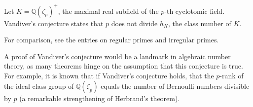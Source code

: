 \documentclass[12pt]{article}
\newcommand{\<}{\langle}
\renewcommand{\>}{\rangle}
\begin{document}
Let $K=\mathbb{Q}(\zeta_p)^+$, the maximal real subfield of the $p$-th cyclotomic field.  Vandiver's conjecture states that $p$ does not divide $h_K$, the class number of $K$.

For comparison, see the entries on regular primes and irregular primes.

A proof of Vandiver's conjecture would be a landmark in algebraic number theory, as many theorems hinge on the assumption that this conjecture is true.  For example, it is known that if Vandiver's conjecture holds, that the $p$-rank of the ideal class group of $\mathbb{Q}(\zeta_p)$ equals the number of Bernoulli numbers divisible by $p$ (a remarkable strengthening of Herbrand's theorem).
\end{document}
